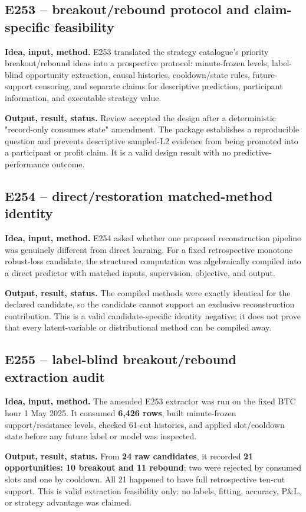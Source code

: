 \documentclass[10pt,a4paper]{article}
\begin{document}
\subsection{E253 -- breakout/rebound protocol and claim-specific feasibility}
\textbf{Idea, input, method.} E253 translated the strategy catalogue's priority breakout/rebound ideas into a prospective protocol: minute-frozen levels, label-blind opportunity extraction, causal histories, cooldown/state rules, future-support censoring, and separate claims for descriptive prediction, participant information, and executable strategy value.\par
\textbf{Output, result, status.} Review accepted the design after a deterministic "record-only consumes state" amendment. The package establishes a reproducible question and prevents descriptive sampled-L2 evidence from being promoted into a participant or profit claim. It is a valid design result with no predictive-performance outcome.\par
\subsection{E254 -- direct/restoration matched-method identity}
\textbf{Idea, input, method.} E254 asked whether one proposed reconstruction pipeline was genuinely different from direct learning. For a fixed retrospective monotone robust-loss candidate, the structured computation was algebraically compiled into a direct predictor with matched inputs, supervision, objective, and output.\par
\textbf{Output, result, status.} The compiled methods were exactly identical for the declared candidate, so the candidate cannot support an exclusive reconstruction contribution. This is a valid candidate-specific identity negative; it does not prove that every latent-variable or distributional method can be compiled away.\par
\subsection{E255 -- label-blind breakout/rebound extraction audit}
\textbf{Idea, input, method.} The amended E253 extractor was run on the fixed BTC hour 1 May 2025. It consumed \textbf{6,426 rows}, built minute-frozen support/resistance levels, checked 61-cut histories, and applied slot/cooldown state before any future label or model was inspected.\par
\textbf{Output, result, status.} From \textbf{24 raw candidates}, it recorded \textbf{21 opportunities: 10 breakout and 11 rebound}; two were rejected by consumed slots and one by cooldown. All 21 happened to have full retrospective ten-cut support. This is valid extraction feasibility only: no labels, fitting, accuracy, P\&L, or strategy advantage was claimed.\par
\end{document}
